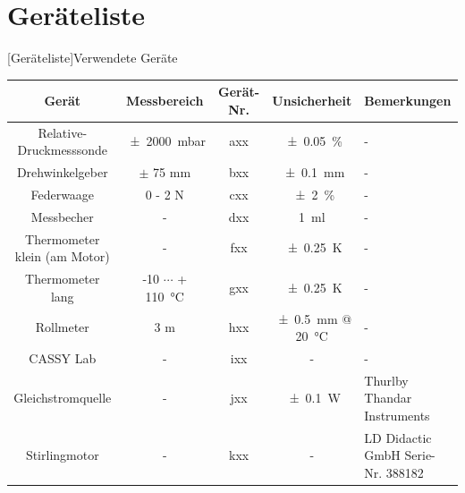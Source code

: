 \documentclass[11pt]{scrartcl}
\begin{document}
\section{Geräteliste}
\label{sec:geraeteliste}
\begin{center}
    [Geräteliste]{Verwendete Geräte}  %
    \label{tab:geraeteliste}
    \vspace{3mm}  %
    \hspace*{-6.0em}
    \begin{tabular}{|c|c|c|c|p{9em}|}
        \hline
        Gerät                        & Messbereich                       & Gerät-Nr. & Unsicherheit                        & Bemerkungen                       \\ \hline
        Relative- Druckmesssonde     & \SI{+- 2000}{\milli\bar}          & axx          & \SI{+-0.05}{\percent}               & -                                 \\ \hline
        Drehwinkelgeber              & $\pm$ 75 mm                       & bxx          & \SI{+-0.1}{\mm}                     & -                                 \\ \hline
        Federwaage                   & 0 - 2 N                           & cxx          & \SI{+-2}{\percent}                  & -                                 \\ \hline
        Messbecher                   & -                                 & dxx          & \SI{1}{\ml}                         & -                                 \\ \hline
        Thermometer klein (am Motor) & -                                 & fxx          & \SI{+-0.25}{\kelvin}                & -                                 \\ \hline
        Thermometer lang             & -10 $\cdots$ + \SI{110}{\celsius} & gxx          & \SI{+-0.25}{\kelvin}                & -                                 \\ \hline
        Rollmeter                    & 3 m                               & hxx          & \SI{+-0.5}{\mm} @ \SI{20}{\celsius} & -                                 \\ \hline
        CASSY Lab                    & -                                 & ixx          & -                      & -                                 \\ \hline
        Gleichstromquelle            & -                                 & jxx          & \SI{+-0.1}{\watt}                     & Thurlby Thandar Instruments       \\ \hline
        Stirlingmotor                & -                                 & kxx          & -                                   & LD Didactic GmbH Serie-Nr. 388182 \\ \hline
        \hline
    \end{tabular}
\end{center}
\end{document}
